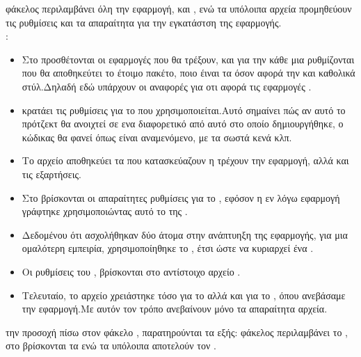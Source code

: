  φάκελος  περιλαμβάνει όλη την εφαρμογή,  και , ενώ τα υπόλοιπα αρχεία προμηθεύουν τις ρυθμίσεις και τα απαραίτητα για την εγκατάστση της εφαρμογής.\\
:
\begin{itemize}
	\item Στο  προσθέτονται οι εφαρμογές που θα τρέξουν, και για την κάθε μια ρυθμίζονται που θα αποθηκεύτει το έτοιμο πακέτο, ποιο έιναι τα  όσον αφορά την  και καθολικά στύλ.Δηλαδή εδώ υπάρχουν οι αναφορές για οτι αφορά τις εφαρμογές .
	\item {} κρατάει τις ρυθμίσεις για το  που χρησιμοποιείται.Αυτό σημαίνει πώς αν αυτό το πρότζεκτ θα ανοιχτεί σε ενα διαφορετικό  από αυτό στο οποίο δημιουργήθηκε, ο κώδικας θα φανεί όπως είναι αναμενόμενο, με τα σωστά κενά κλπ.
	\item Το αρχείο  αποθηκεύει τα  που κατασκεύαζουν η τρέχουν την εφαρμογή, αλλά και τις εξαρτήσεις.
	\item Στο  βρίσκονται οι απαραίτητες ρυθμίσεις για το , εφόσον η εν λόγω εφαρμογή γράφτηκε χρησιμοποιώντας αυτό το  της .
	\item Δεδομένου ότι ασχολήθηκαν δύο άτομα στην ανάπτυηξη της εφαρμογής, για μια ομαλότερη εμπειρία, χρησιμοποίηθηκε το , έτσι ώστε να κυριαρχεί ένα . 
	\item Οι ρυθμίσεις του , βρίσκονται στο αντίστοιχο αρχείο .
	\item Τελευταίο, το αρχείο  χρειάστηκε τόσο για το  αλλά και για το , όπου ανεβάσαμε την εφαρμογή.Με αυτόν τον τρόπο ανεβαίνουν μόνο τα απαραίτητα αρχεία.
\end{itemize}
 την προσοχή πίσω στον φάκελο , παρατηρούνται τα εξής:
 φάκελος  περιλαμβάνει το , στο  βρίσκονται τα  ενώ τα υπόλοιπα αποτελούν τον .

